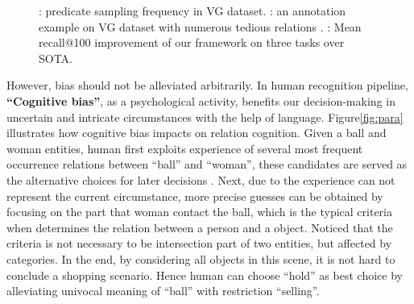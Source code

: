 \documentclass[runningheads]{llncs}
\begin{document}
\begin{figure}[t!]
  \quad
   \quad
  \caption{\protect{}: predicate sampling frequency in VG dataset. \protect{}: {an annotation example on VG dataset with numerous tedious relations }. \protect{}: Mean recall@100 improvement of our framework on three tasks over SOTA.}
  \label{intro}
  
\end{figure}

However,  bias should not be alleviated arbitrarily. In human recognition
pipeline, \textbf{``Cognitive bias''}\cite{cogbias}, as  a psychological
activity,  benefits our decision-making in uncertain and intricate
circumstances with the help of language\cite{advbias}. Figure\ref{fig:para}
illustrates how  cognitive bias impacts on relation cognition. Given a ball and
woman entities,
human first exploits experience of several  most frequent occurrence relations
between ``ball'' and ``woman'', these candidates are served as the alternative
choices for later decisions . Next, due to the experience can not represent the
current circumstance, more precise guesses can be obtained by focusing on the
part that woman contact the ball, which is the typical criteria when determines
the relation between a person and a object. Noticed that the criteria is not
necessary to be intersection part of two entities, but affected by categories.
In the end, by considering all objects in this scene, it is not hard to
conclude a shopping scenario. Hence human can choose ``hold'' as best choice by
alleviating univocal meaning of ``ball'' with restriction ``selling''.
\end{document}
